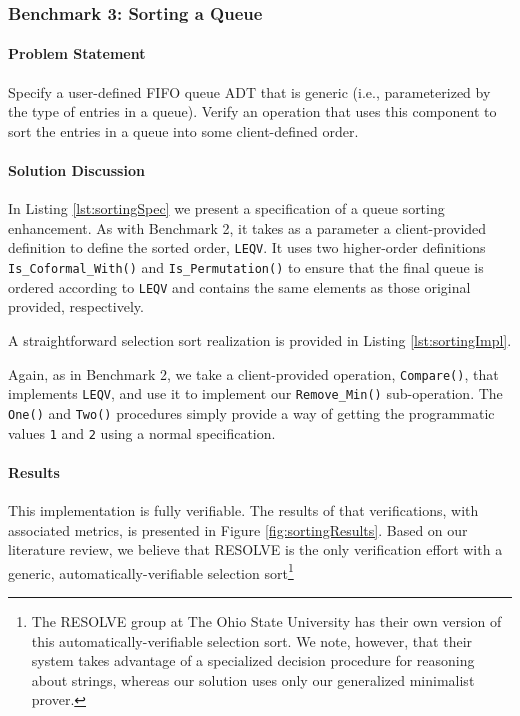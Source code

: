 \FloatBarrier
		\subsubsection{Benchmark 3: Sorting a Queue}	%

\paragraph{Problem Statement}Specify a user-defined FIFO queue ADT that is generic (i.e., parameterized by the type of entries in a queue). Verify an operation that uses this component to sort the entries in a queue into some client-defined order.

\paragraph{Solution Discussion}In Listing \ref{lst:sortingSpec} we present a specification of a queue sorting enhancement.  As with Benchmark 2, it takes as a parameter a client-provided definition to define the sorted order, \texttt{LEQV}.  It uses two higher-order definitions \texttt{Is\_Coformal\_With()} and \texttt{Is\_Permutation()} to ensure that the final queue is ordered according to \texttt{LEQV} and contains the same elements as those original provided, respectively.



A straightforward selection sort realization is provided in Listing \ref{lst:sortingImpl}.



Again, as in Benchmark 2, we take a client-provided operation, \texttt{Compare()}, that implements \texttt{LEQV}, and use it to implement our \texttt{Remove\_Min()} sub-operation.  The \texttt{One()} and \texttt{Two()} procedures simply provide a way of getting the programmatic values \texttt{1} and \texttt{2} using a normal specification.

\paragraph{Results}This implementation is fully verifiable.  The results of that verifications, with associated metrics, is presented in Figure \ref{fig:sortingResults}.  Based on our literature review, we believe that RESOLVE is the only verification effort with a generic, automatically-verifiable selection sort\footnote{The RESOLVE group at The Ohio State University has their own version of this automatically-verifiable selection sort.  We note, however, that their system takes advantage of a specialized decision procedure for reasoning about strings, whereas our solution uses only our generalized minimalist prover.}

